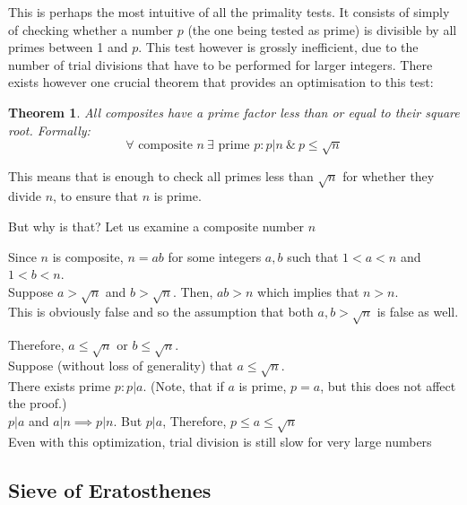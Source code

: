 \documentclass[12pt, titlepage]{article}
\newtheorem{theorem}{Theorem}
\begin{document}
    This is perhaps the most intuitive of all the primality tests. It consists of simply of
    checking whether a number $p$ (the one being tested as prime) is divisible by all primes
    between 1 and $p$. This test however is grossly inefficient, due to the number of trial
    divisions that have to be performed for larger integers. There exists however one
    crucial theorem that provides an optimisation to this test:
    \begin{theorem} \label{th:prime_factors_less_than_root}
        All composites have a prime factor less than or equal to their square
        root. Formally:\\
        $$\forall \text{ composite } n \: \exists \text{ prime } p:p|n \: \& \: p \leq \sqrt{n}$$
    \end{theorem}
    This means that is enough to check all primes less than $\sqrt{n}$ for whether they
    divide $n$, to ensure that $n$ is prime. 
    
    But why is that? Let us examine a composite number $n$

    Since $n$ is composite, $n=ab$ for some integers $a, b$ such that $1<a<n$ and $1<b<n$.\\
    Suppose $a>\sqrt{n}$ and $b>\sqrt{n}$. Then, $ab>n$ which implies that $n>n$. \\
    This is obviously false and so the assumption that both $a,b > \sqrt{n}$ is false as
    well.

    Therefore, $a \leq \sqrt{n}$ or $b \leq \sqrt{n}$. \\
    Suppose (without loss of generality) that $a \leq \sqrt{n}$.\\
    There exists prime $p: p|a$. (Note, that if $a$ is prime, $p = a$, but this does not
    affect the proof.)\\
    $p|a$ and $a|n \implies p|n$. But $p|a$, Therefore,  $p \leq a \leq \sqrt{n}$\\
    
    Even with this optimization, trial division is still slow for very large numbers 

    \subsection{Sieve of Eratosthenes}
\end{document}
